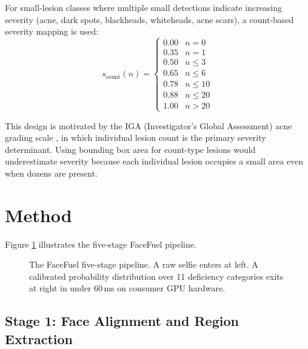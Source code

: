\documentclass[journal]{IEEEtran}
\begin{document}
For small-lesion classes where multiple small detections indicate increasing
severity (acne, dark spots, blackheads, whiteheads, acne scars), a count-based
severity mapping is used:
\begin{equation}
s_{\text{count}}(n) = \begin{cases}
0.00 & n = 0 \\
0.35 & n = 1 \\
0.50 & n \leq 3 \\
0.65 & n \leq 6 \\
0.78 & n \leq 10 \\
0.88 & n \leq 20 \\
1.00 & n > 20
\end{cases}
\label{eq:count_sev}
\end{equation}

This design is motivated by the IGA (Investigator's Global Assessment) acne
grading scale \cite{doshi1997}, in which individual lesion count is the primary
severity determinant. Using bounding box area for count-type lesions
would underestimate severity because each individual lesion occupies a small
area even when dozens are present.

\section{Method}
\label{sec:method}

Figure \ref{fig:pipeline} illustrates the five-stage FaceFuel pipeline.

\begin{figure}[t]
\centering
{}
\caption{The FaceFuel five-stage pipeline. A raw selfie enters at left.
A calibrated probability distribution over 11 deficiency categories exits
at right in under 60\,ms on consumer GPU hardware.}
\label{fig:pipeline}
\end{figure}

\subsection{Stage 1: Face Alignment and Region Extraction}
\end{document}
